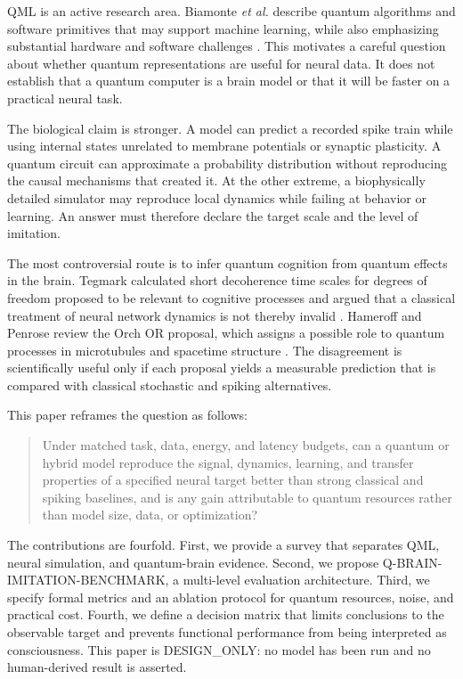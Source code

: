 \documentclass[conference]{IEEEtran}
\begin{document}
QML is an active research area. Biamonte \emph{et al.} describe quantum algorithms and
software primitives that may support machine learning, while also emphasizing substantial
hardware and software challenges \cite{biamonte2017}. This motivates a careful question
about whether quantum representations are useful for neural data. It does not establish
that a quantum computer is a brain model or that it will be faster on a practical neural
task.

The biological claim is stronger. A model can predict a recorded spike train while
using internal states unrelated to membrane potentials or synaptic plasticity. A quantum
circuit can approximate a probability distribution without reproducing the causal
mechanisms that created it. At the other extreme, a biophysically detailed simulator
may reproduce local dynamics while failing at behavior or learning. An answer must
therefore declare the target scale and the level of imitation.

The most controversial route is to infer quantum cognition from quantum effects in the
brain. Tegmark calculated short decoherence time scales for degrees of freedom proposed
to be relevant to cognitive processes and argued that a classical treatment of neural
network dynamics is not thereby invalid \cite{tegmark2000}. Hameroff and Penrose review
the Orch OR proposal, which assigns a possible role to quantum processes in microtubules
and spacetime structure \cite{hameroff2014}. The disagreement is scientifically useful
only if each proposal yields a measurable prediction that is compared with classical
stochastic and spiking alternatives.

This paper reframes the question as follows:

\begin{quote}
Under matched task, data, energy, and latency budgets, can a quantum or hybrid model
reproduce the signal, dynamics, learning, and transfer properties of a specified neural
target better than strong classical and spiking baselines, and is any gain attributable
to quantum resources rather than model size, data, or optimization?
\end{quote}

The contributions are fourfold. First, we provide a survey that separates QML, neural
simulation, and quantum-brain evidence. Second, we propose Q-BRAIN-IMITATION-BENCHMARK,
a multi-level evaluation architecture. Third, we specify formal metrics and an ablation
protocol for quantum resources, noise, and practical cost. Fourth, we define a
decision matrix that limits conclusions to the observable target and prevents functional
performance from being interpreted as consciousness. This paper is DESIGN\_ONLY: no
model has been run and no human-derived result is asserted.
\end{document}
